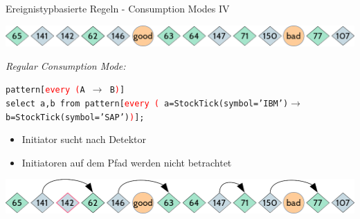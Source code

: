 \documentclass[usenames,dvipsnames]{beamer}
\begin{document}
\begin{frame}{Ereignistypbasierte Regeln - Consumption Modes IV}
\begin{center}
    \includegraphics[scale=0.4]{img/stream-2}
\end{center}
\begin{exampleblock}{\textit{Regular Consumption Mode:}}
    \begin{center}
        \texttt{pattern[\textcolor{red}{every (}A $\rightarrow$  
        B\textcolor{red}{)}]}\\\vspace{0.3cm}
        \texttt{select a,b from pattern[\textcolor{red}{every (}%
        a=StockTick(symbol='IBM')$\rightarrow$  
        b=StockTick(symbol='SAP')\textcolor{red}{)}];}
    \end{center}
    \begin{itemize}
        \item Initiator sucht nach Detektor
        \item Initiatoren auf dem Pfad werden nicht betrachtet
    \end{itemize}
\end{exampleblock}

\begin{center}
    \includegraphics[scale=0.4]{img/solution-f}
\end{center}
\end{frame}
\end{document}
